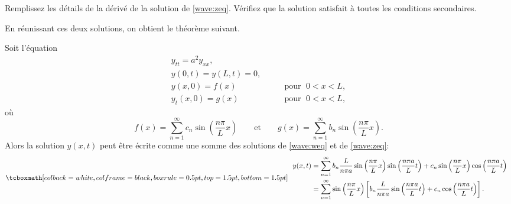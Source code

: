 \begin{exercise}
Remplissez les détails de la dérivé de la solution de \eqref{wave:zeq}.
Vérifiez que la solution satisfait à toutes les conditions secondaires.
\end{exercise}

En réunissant ces deux solutions,  on obtient le théorème  suivant. 
\begin{theorem}
Soit l'équation
\begin{equation} \label{wave:tyeq}
\begin{array}{ll}
y_{tt} = a^2 y_{xx} , &  \\
y(0,t) = y(L,t) = 0 , &  \\
y(x,0) = f(x) & \qquad \text{pour } \; 0 < x < L , \\
y_t(x,0) = g(x) & \qquad \text{pour } \; 0 < x < L ,
\end{array}
\end{equation}
où
\begin{equation*}
f(x) =
\sum_{n=1}^\infty c_n \sin \left( \frac{n \pi}{L} x \right)
\qquad \text{et} \qquad
g(x) =
\sum_{n=1}^\infty b_n \sin \left( \frac{n \pi}{L} x \right) .
\end{equation*}
Alors la solution $ y (x, t) $ peut être écrite comme une somme des solutions
de \eqref{wave:weq} et de  \eqref{wave:zeq}:
\begin{equation*}
\mybxbg{~~
\begin{aligned}
y(x,t)
& =
\sum_{n=1}^\infty
b_n
\frac{L}{n \pi a}
\sin \left( \frac{n \pi}{L} x \right)
\sin \left( \frac{n \pi a}{L} t \right) 
+
c_n
\sin \left( \frac{n \pi}{L} x \right)
\cos \left( \frac{n \pi a}{L} t \right) 
\\
& =
\sum_{n=1}^\infty
\sin \left( \frac{n \pi}{L} x \right)
\left[
b_n
\frac{L}{n \pi a}
\sin \left( \frac{n \pi a}{L} t \right) 
+
c_n
\cos \left( \frac{n \pi a}{L} t \right) 
\right] .
\end{aligned}
~~}
\end{equation*}
\end{theorem}

